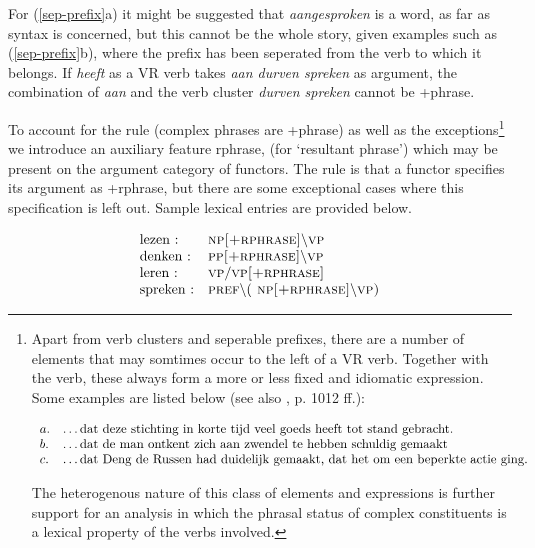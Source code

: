\noindent For (\ref{sep-prefix}a) it might be suggested that {\em aangesproken}
is a word, as far as syntax is concerned, but this cannot be the whole story,
given examples such as (\ref{sep-prefix}b), where the prefix has been seperated
from the verb to which it belongs.  If {\em heeft} as a VR verb takes {\em aan
durven spreken} as argument, the combination of {\em aan} and the verb cluster
{\em durven spreken} cannot be {\sc +phrase}.

To account for the rule (complex phrases are {\sc +phrase}) as well as the
exceptions\footnote{
Apart from verb clusters and seperable prefixes, there are a number of elements 
that may somtimes occur to the left of a VR verb. Together with the verb, these 
always form a more or less fixed and idiomatic expression. Some examples are 
listed below (see also \cite{ans}, p. 1012 ff.):

\[
\begin{array}[t]{ll@{\hspace{0cm}}l}
a. && \ldots\mbox{dat deze stichting in korte tijd veel goeds heeft tot stand 
gebracht.} \\
b. && \ldots\mbox{dat de man ontkent zich aan zwendel te hebben schuldig 
gemaakt} \\
c. && \ldots\mbox{dat Deng de Russen had duidelijk gemaakt, dat het om 
een beperkte actie ging.}
\end{array}
\]

The heterogenous nature of this class of elements and expressions is further 
support for an analysis in which the phrasal status of complex constituents is a 
lexical property of the verbs involved.
}
we introduce an auxiliary feature {\sc rphrase}, (for `resultant
phrase') which may be present on the argument category of functors.  The rule is
that a functor specifies its argument as {\sc +rphrase}, but there are some
exceptional cases where this specification is left out.  Sample lexical entries
are provided below.

\begin{equation}
\begin{array}[t]{ll}
\mbox{lezen :} & \mbox{\sc np[+rphrase]$\backslash$vp} \\ 
\mbox{denken :}& \mbox{\sc pp[+rphrase]$\backslash$vp} \\
\mbox{leren :} & \mbox{\sc vp}/ \mbox{\sc vp[+rphrase]} \\ 
\mbox{spreken :} & \mbox{\sc pref$\backslash($ np[+rphrase]$\backslash$vp)}
\end{array}
\end{equation}

